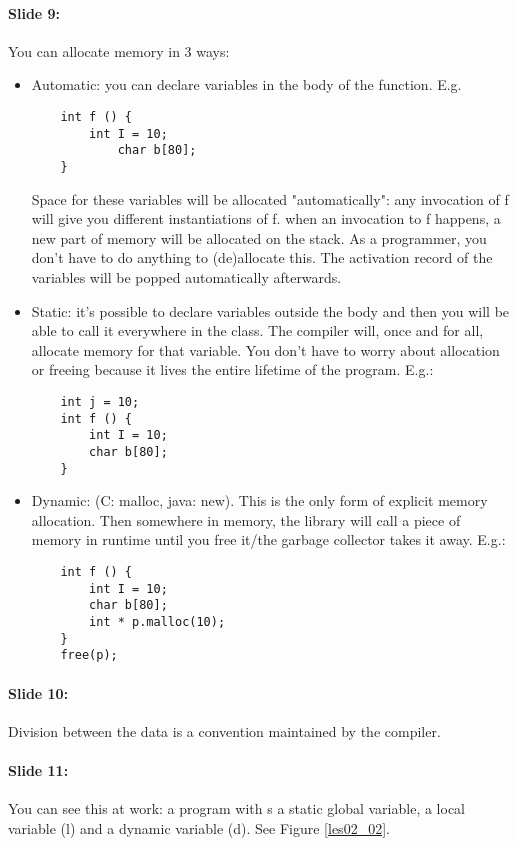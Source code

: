 \documentclass[10pt,a4paper]{report}
\begin{document}
\paragraph{Slide 9:} You can allocate memory in 3 ways:
\begin{itemize}
\item Automatic: you can declare variables in the body of the function. E.g.
\begin{verbatim}
	int f () {
	    int I = 10;
	        char b[80];
	}
\end{verbatim}
Space for these variables will be allocated "automatically": any invocation of f will give you different instantiations of f. when an invocation to f happens, a new part of memory will be allocated on the stack. As a programmer, you don't have to do anything to (de)allocate this. The activation record of the variables will be popped automatically afterwards.
\item Static: it's possible to declare variables outside the body and then you will be able to call it everywhere in the class. The compiler will, once and for all, allocate memory for that variable. You don't have to worry about allocation or freeing because it lives the entire lifetime of the program. E.g.:
\begin{verbatim}
	int j = 10;
	int f () {
	    int I = 10;
	    char b[80];
	}
\end{verbatim}
\item Dynamic: (C: malloc, java: new). This is the only form of explicit memory allocation. Then somewhere in memory, the library will call a piece of memory in runtime until you free it/the garbage collector takes it away. E.g.:
\begin{verbatim}
	int f () {
	    int I = 10;    
	    char b[80];    
	    int * p.malloc(10);
	} 
	free(p);
\end{verbatim}
\end{itemize}

\paragraph{Slide 10:} Division between the data is a convention maintained by the compiler.

\paragraph{Slide 11:} You can see this at work: a program with s a static global variable, a local variable (l) and a dynamic variable (d). See Figure \ref{les02_02}.
\end{document}
